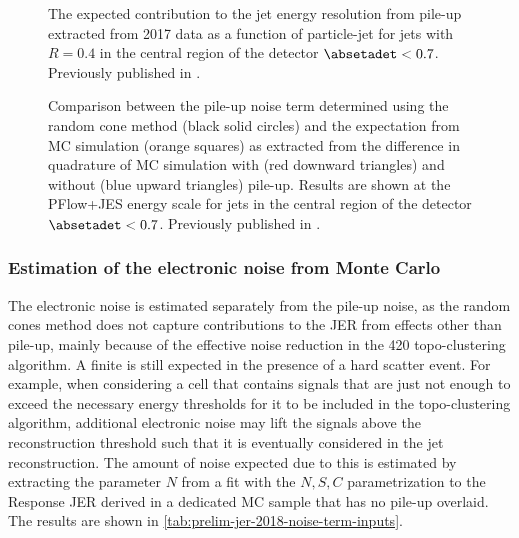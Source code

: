 \begin{figure}[t]
    \caption[The expected contribution to the JER from pile-up.]{The expected contribution to the jet energy resolution from pile-up extracted from 2017 data as a function of particle-jet \pT for \antikt jets with $R = 0.4$ in the central region of the detector $\absetadet < 0.7$. Previously published in .}
    \label{fig:pile-up-jer-vs-pt}
\end{figure}



\begin{figure}[t]
    \caption[Comparison between the pile-up noise term and the expectation from MC simulation.]{Comparison between the pile-up noise term \Npileup determined using the random cone method (black solid circles) and the expectation from MC simulation (orange squares) as extracted from the difference in quadrature of MC simulation with (red downward triangles) and without (blue upward triangles) pile-up. Results are shown at the PFlow+JES energy scale for jets in the central region of the detector $\absetadet < 0.7$. Previously published in .}
    \label{fig:non-closure}
\end{figure}



\subsubsection{Estimation of the electronic noise from Monte Carlo}
\label{subsec:electronic-noise-extraction}
The electronic noise is estimated separately from the pile-up noise, as the random cones method does not capture contributions to the JER from effects other than pile-up, mainly because of the effective noise reduction in the 420 topo-clustering algorithm.
A finite \Nmuzero is still expected in the presence of a hard scatter event.
For example, when considering a cell that contains signals that are just not enough to exceed the necessary energy thresholds for it to be included in the topo-clustering algorithm, additional electronic noise may lift the signals above the reconstruction threshold such that it is eventually considered in the jet reconstruction.
The amount of noise expected due to this is estimated by extracting the parameter $N$ from a fit with the $N, S, C$ parametrization to the Response JER derived in a dedicated MC sample that has no pile-up overlaid.
The results are shown in \cref{tab:prelim-jer-2018-noise-term-inputs}.

